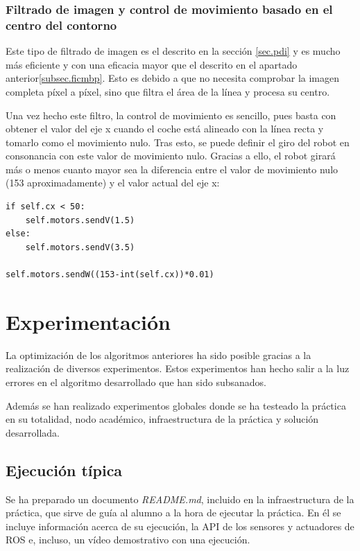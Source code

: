 \subsubsection{Filtrado de imagen y control de movimiento basado en el centro del contorno}
Este tipo de filtrado de imagen es el descrito en la sección \ref{sec.pdi} y es mucho más eficiente y con una eficacia mayor que el descrito en el apartado anterior\ref{subsec.ficmbp}. Esto es debido a que no necesita comprobar la imagen completa píxel a píxel, sino que filtra el área de la línea y procesa su centro.

Una vez hecho este filtro, la control de movimiento es sencillo, pues basta con obtener el valor del eje x cuando el coche está alineado con la línea recta y tomarlo como el movimiento nulo. Tras esto, se puede definir el giro del robot en consonancia con este valor de movimiento nulo.
Gracias a ello, el robot girará más o menos cuanto mayor sea la diferencia entre el valor de movimiento nulo (153 aproximadamente) y el valor actual del eje x:

\lstset{language=Python, breaklines=true, basicstyle=\footnotesize}
\begin{lstlisting}[frame=single]
if self.cx < 50:
    self.motors.sendV(1.5)
else:
    self.motors.sendV(3.5)

self.motors.sendW((153-int(self.cx))*0.01)
\end{lstlisting}

\section{Experimentación}
La optimización de los algoritmos anteriores ha sido posible gracias a la realización de diversos experimentos. Estos experimentos han hecho salir a la luz errores en el algoritmo desarrollado que han sido subsanados.

Además se han realizado experimentos globales donde se ha testeado la práctica en su totalidad, nodo académico, infraestructura de la práctica y solución desarrollada.

\subsection{Ejecución típica}
Se ha preparado un documento \textit{README.md}, incluido en la infraestructura de la práctica, que sirve de guía al alumno a la hora de ejecutar la práctica. En él se incluye información acerca de su ejecución, la API de los sensores y actuadores de ROS e, incluso, un vídeo demostrativo con una ejecución.

